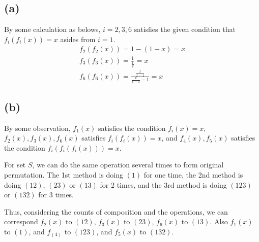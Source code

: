 \documentclass[12pt]{article}
\title{\mytitle}
\author{\textbf{\myauthor}}
\date{\today}
\begin{document}
\maketitle

\section{}
\subsection*{(a)}
By some calculation as belows, $i=2,3,6$ satisfies the given condition that $f_i(f_i(x))=x$ asides from $i=1$.
\begin{align*}
    f_2(f_2(x))=1-(1-x)=x \\
    f_3(f_3(x))=\frac{1}{\frac{1}{x}}=x \\
    f_6(f_6(x))=\frac{\frac{x}{x-1}}{\frac{x}{x-1}-1}=x
\end{align*}
\subsection*{(b)}
By some observation, $f_1(x)$ satisfies the condition $f_i(x)=x$, $f_2(x),f_3(x),f_6(x)$ satisfies $f_i(f_i(x))=x$, and $f_4(x),f_5(x)$ satisfies the condition $f_i(f_i(f_i(x)))=x$.

For set $S$, we can do the same operation several times to form original permutation. The 1st method is doing $(1)$ for one time, the 2nd method is doing $(12)$, $(23)$ or $(13)$ for 2 times, and the 3rd method is doing $(123)$ or $(132)$ for 3 times.

Thus, considering the counts of composition and the operations, we can correspond $f_2(x)$ to $(12)$, $f_3(x)$ to $(23)$, $f_6(x)$ to $(13)$. Also $f_1(x)$ to $(1)$, and $f_(4)$ to $(123)$, and $f_5(x)$ to $(132)$.
\end{document}
